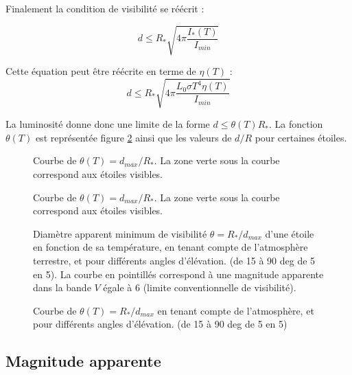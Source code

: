 \documentclass[11pt]{article} %
\begin{document}
Finalement la condition de visibilité se réécrit :

\begin{equation}
 d \leq R_{*} \sqrt{4\pi\dfrac{I_*(T)}{I_{min}}}
\end{equation}

Cette équation peut être réécrite en terme de $\eta(T)$ :
\begin{equation}
 d \leq R_{*} \sqrt{4\pi\dfrac{L_0 \sigma T^4 \eta(T)}{I_{min}}}
\end{equation}

La luminosité donne donc une limite de la forme $d \leq \theta (T) R_*$. La fonction $\theta(T)$ est représentée figure \ref{fig:theta} ainsi que les valeurs de $d/R$ pour certaines étoiles. 

\begin{figure}[H]
\centering
  \caption{Courbe de $\theta(T) =  d_{max}/R_*$. La zone verte sous la courbe correspond aux étoiles visibles.  
\label{fig:theta}}

\end{figure}


\begin{figure}[H]
\centering
  \caption{Courbe de $\theta(T) =  d_{max}/R_* $. La zone verte sous la courbe correspond aux étoiles visibles.  
\label{fig:theta}}

\end{figure}

\begin{figure}[H]
\centering
  \caption{Diamètre apparent minimum de visibilité $\theta =  R_*/d_{max}$ d'une étoile en fonction de sa température, en tenant compte de l'atmosphère terrestre, et pour différents angles d'élévation. (de 15 à 90 deg de 5 en 5). La courbe en pointillés correspond à une magnitude apparente dans la bande $V$ égale à 6 (limite conventionnelle de visibilité).
\label{fig:theta_atmosphere}}

\end{figure}

\begin{figure}[H]
\centering
  \caption{Courbe de $\theta(T) =  R_*/d_{max} $ en tenant compte de l'atmosphère, et pour différents angles d'élévation. (de 15 à 90 deg de 5 en 5)
\label{fig:theta_high_atmosphere}}

\end{figure}

\subsection{Magnitude apparente}
\end{document}
